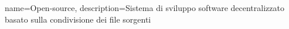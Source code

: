 {
	name={Open-source},
	description={Sistema di sviluppo software decentralizzato basato sulla condivisione dei file sorgenti}
}